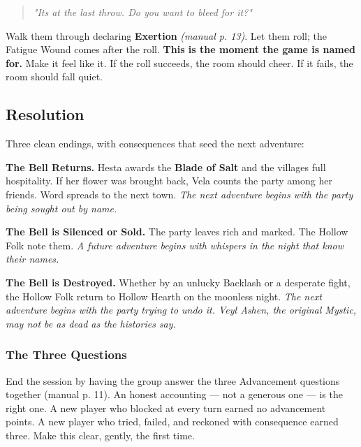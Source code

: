 \documentclass[10pt,a4paper]{article}
\begin{document}
\begin{quote}
\emph{"It\textquotesingle s at the last throw. Do you want to bleed for it?"}
\end{quote}

Walk them through declaring \textbf{Exertion} \emph{(manual p. 13)}. Let them roll; the Fatigue Wound comes after the roll. \textbf{This is the moment the game is named for.} Make it feel like it. If the roll succeeds, the room should cheer. If it fails, the room should fall quiet.

\par\vspace{3pt}

\subsection{Resolution}\label{resolution}

Three clean endings, with consequences that seed the next adventure:

\textbf{The Bell Returns.} Hesta awards the \textbf{Blade of Salt} and the village\textquotesingle s full hospitality. If her flower was brought back, Vela counts the party among her friends. Word spreads to the next town. \emph{The next adventure begins with the party being sought out by name.}

\textbf{The Bell is Silenced or Sold.} The party leaves rich and marked. The Hollow Folk note them. \emph{A future adventure begins with whispers in the night that know their names.}

\textbf{The Bell is Destroyed.} Whether by an unlucky Backlash or a desperate fight, the Hollow Folk return to Hollow Hearth on the moonless night. \emph{The next adventure begins with the party trying to undo it. Veyl Ashen, the original Mystic, may not be as dead as the histories say.}

\subsubsection{The Three Questions}\label{the-three-questions}

End the session by having the group answer the three Advancement questions together (manual p. 11). An honest accounting --- not a generous one --- is the right one. A new player who blocked at every turn earned no advancement points. A new player who tried, failed, and reckoned with consequence earned three. Make this clear, gently, the first time.

\par\vspace{3pt}
\end{document}
